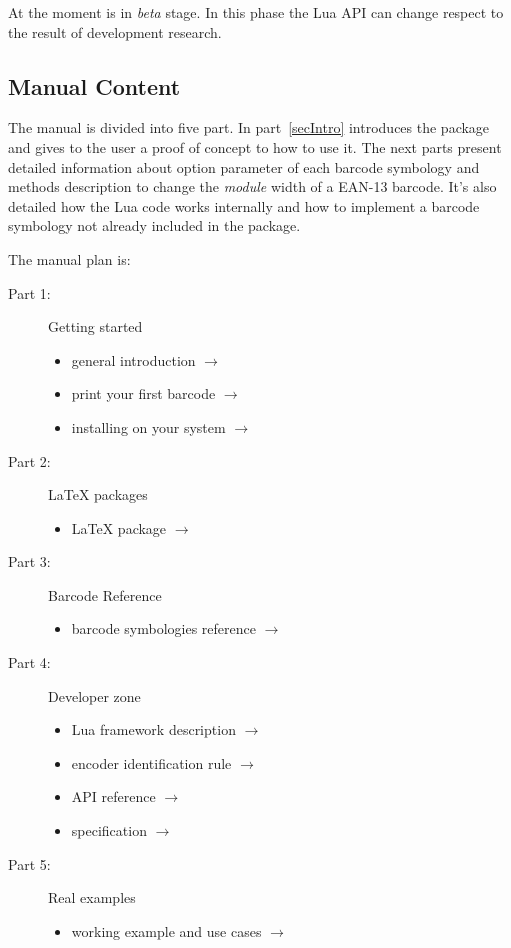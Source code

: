 \documentclass[11pt,a4paper]{article}
\begin{document}
At the moment \brcd{} is in \emph{beta} stage. In this phase the Lua API can
change respect to the result of development research.


\subsection{Manual Content}

The manual is divided into five part. In part~\ref{secIntro} introduces the
package and gives to the user a proof of concept to how to use it. The next
parts present detailed information about option parameter of each barcode
symbology and methods description to change the \emph{module} width of a EAN-13
barcode. It's also detailed how the Lua code works internally and how to
implement a barcode symbology not already included in the package.

The manual plan is:
\begin{description}
\item[Part 1:] Getting started
\begin{itemize}
	\item general introduction \( \to \) \pageref{secIntro}
	\item print your first barcode \( \to \) \pageref{secEnter}
	\item installing \brcd{} on your system \( \to \) \pageref{secInstall}
\end{itemize}

\item[Part 2:] \LaTeX{} packages
\begin{itemize}
	\item \brcd{} \LaTeX{} package \( \to \) \pageref{secLaTeXPkg}
\end{itemize}

\item[Part 3:] Barcode Reference
\begin{itemize}
	\item barcode symbologies reference \( \to \) \pageref{secBcRef}
\end{itemize}

\item[Part 4:] Developer zone
\begin{itemize}
	\item Lua framework description \( \to \) \pageref{secFramework}
    \item encoder identification rule \( \to \) \pageref{secEncName}
	\item API reference \( \to \) \pageref{secAPI}
	\item {} specification \( \to \) \pageref{secGA}
\end{itemize}

\item[Part 5:] Real examples
\begin{itemize}
	\item working example and use cases \( \to \) \pageref{secExample}
\end{itemize}
\end{description}
\end{document}
